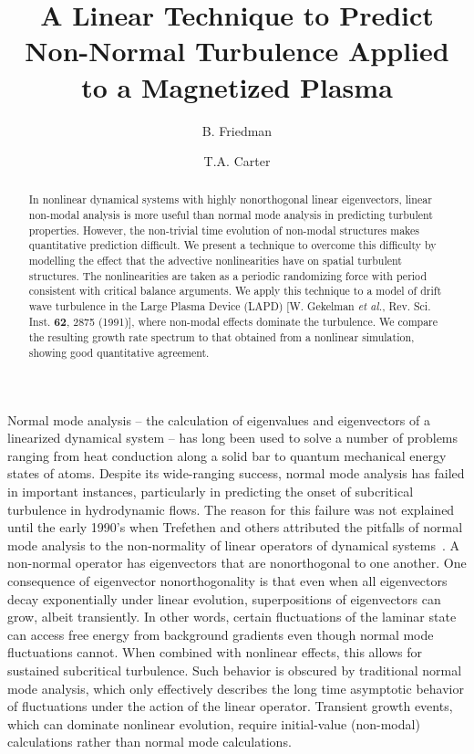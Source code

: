 \documentclass[letter,scriptaddress,twocolumn, prl,showkeys]{revtex4}
\begin{document}
\title{A Linear Technique to Predict Non-Normal Turbulence Applied to a Magnetized Plasma}

\author{B. Friedman}

\author{T.A. Carter}




\begin{abstract}
In nonlinear dynamical systems with highly nonorthogonal linear eigenvectors, linear non-modal analysis is more useful than normal mode analysis in predicting turbulent properties. 
However, the non-trivial time evolution of non-modal structures makes quantitative prediction difficult. We present a technique to overcome this difficulty by modelling the effect that the advective nonlinearities have on spatial turbulent structures. The nonlinearities are taken as a periodic randomizing force with
period consistent with critical balance arguments. We apply this technique to a model of drift wave turbulence in the Large Plasma Device (LAPD) 
[W. Gekelman \emph{et al.}, Rev. Sci. Inst. {\bf 62}, 2875 (1991)], where non-modal effects dominate the turbulence.
We compare the resulting growth rate spectrum to that obtained from a nonlinear simulation, showing good quantitative agreement.
\end{abstract}

\maketitle

Normal mode analysis -- the calculation of eigenvalues and eigenvectors of a linearized dynamical system -- has long been used to solve a number of problems ranging from
heat conduction along a solid bar to quantum mechanical energy states of atoms. Despite its wide-ranging success, normal mode analysis has
failed in important instances, particularly in predicting the onset of subcritical turbulence in hydrodynamic flows. 
The reason for this failure was not explained until the early 1990's when Trefethen and others attributed the pitfalls of normal mode analysis to the non-normality of linear operators of
dynamical systems~\cite{trefethen1993,schmid2007}. A non-normal operator has 
eigenvectors that are nonorthogonal to one another. One consequence of eigenvector nonorthogonality is that even when all eigenvectors decay exponentially under linear evolution, 
superpositions of eigenvectors can grow, albeit transiently.
In other words, certain fluctuations of the laminar state can access free energy from background gradients even though normal mode fluctuations cannot.
When combined with nonlinear effects, this allows for sustained subcritical turbulence.
Such behavior is obscured by traditional normal mode analysis, which only effectively describes the long time asymptotic behavior of fluctuations under the 
action of the linear operator. Transient growth events, which can dominate nonlinear evolution, require initial-value (non-modal) calculations rather than normal mode calculations.
\end{document}
